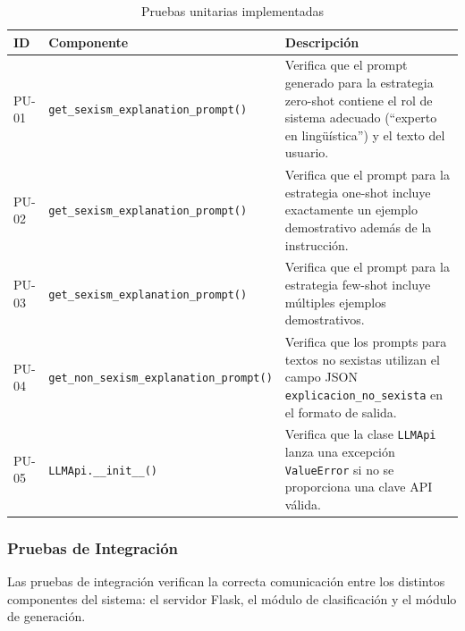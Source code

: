 \begin{table}[H]
\centering
\caption{Pruebas unitarias implementadas}
\label{tab:pruebas-unitarias}
\begin{tabular}{|l|p{4cm}|p{5.5cm}|}
\hline
\textbf{ID} & \textbf{Componente} & \textbf{Descripción} \\ \hline

PU-01 & \texttt{get\_sexism\_explanation\_prompt()} & Verifica que el prompt generado para la estrategia zero-shot contiene el rol de sistema adecuado (``experto en lingüística'') y el texto del usuario. \\ \hline

PU-02 & \texttt{get\_sexism\_explanation\_prompt()} & Verifica que el prompt para la estrategia one-shot incluye exactamente un ejemplo demostrativo además de la instrucción. \\ \hline

PU-03 & \texttt{get\_sexism\_explanation\_prompt()} & Verifica que el prompt para la estrategia few-shot incluye múltiples ejemplos demostrativos. \\ \hline

PU-04 & \texttt{get\_non\_sexism\_explanation\_prompt()} & Verifica que los prompts para textos no sexistas utilizan el campo JSON \texttt{explicacion\_no\_sexista} en el formato de salida. \\ \hline

PU-05 & \texttt{LLMApi.\_\_init\_\_()} & Verifica que la clase \texttt{LLMApi} lanza una excepción \texttt{ValueError} si no se proporciona una clave API válida. \\ \hline

\end{tabular}
\end{table}

\subsubsection{Pruebas de Integración}

Las pruebas de integración verifican la correcta comunicación entre los distintos componentes del sistema: el servidor Flask, el módulo de clasificación y el módulo de generación.

